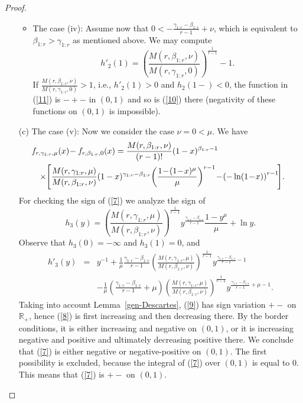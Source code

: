 \documentclass [11pt]{article}
\begin{document}
\begin{proof}
\begin{enumerate}
\begin{itemize}
        \item
        The case (iv): %
        Assume now that $0 < -\frac{\gamma_{1:r}-\beta_{1:r}}{r-1}+\nu $, which is equivalent to $\beta_{1:r}> \gamma_{1:r}$ as mentioned above. We may compute
        \begin{equation*}
        h'_2(1) =  \left(\frac{M(r,\beta_{1:r},\nu)}{M(r,\gamma_{1:r},0)}\right)^{\frac1{r-1}}
        -1.
        \label{13}
        \end{equation*}
        If $\frac{M(r,\beta_{1:r},\nu)}{M(r,\gamma_{1:r},0)}>1$,
        i.e., $h'_2(1)>0$ and $h_2(1-) <0$, the function in (\ref{11}) is $-+-$ in $(0,1)$ and so is (\ref{10}) there (negativity of these functions on $(0,1)$ is impossible).     
        \end{itemize}

\item[(c)]
    The case (v): %
    Now we consider the case $\nu=0 <\mu$. We have
    \begin{eqnarray}
    \lefteqn{f_{r,\gamma_{1:r},\mu}(x) \!-f_{r,\beta_{1:r},0}(x)  =
    \frac{M(r,\beta_{1:r},\nu)}{(r-1)!}
    (1-x)^{\beta_{1:r}-1} } \nonumber \\
     & & \times\!
     \left[ \frac{M(r,\gamma_{1:r},\mu)}{M(r,\beta_{1:r},\nu)}
     (1-x)^{\gamma_{1:r}-
    \beta_{1:r}}\!\left( \frac{1\!-\!(1\!-\!x)^\mu}{\mu}\right)^{r-1}
    \!-\! \left( -\ln (1\!-\!x)\right)^{r-1}\! \right]\!.\;\;
    \label{7}
    \end{eqnarray}
    For checking the sign of (\ref{7}) we analyze the sign of
    \begin{equation}
    h_3(y) = \left(\frac{M(r,\gamma_{1:r},\mu)}{M(r,\beta_{1:r},\nu)}\right)^{\frac1{r-1}}
    y^{\frac{\gamma_{1:r}-\beta_{1:r}}{r-1}}
    \frac{1-y^\mu}{\mu} + \ln y .
    \label{8}
    \end{equation}
    Observe that $h_3(0)=-\infty$ and $h_3(1)=0$, and
    \begin{eqnarray}
    h'_3(y) & = & y^{-1} +\frac{1}{\mu}\frac{\gamma_{1:r}-\beta_{1:r}}{r-1}
    \left(\frac{M(r,\gamma_{1:r},\mu)}{M(r,\beta_{1:r},\nu)}\right)^{\frac1{r-1}}
    y^{\frac{\gamma_{1:r}-\beta_{1:r}}{r-1}-1} \nonumber \\
    & & -
    \frac{1}{\mu}\left(\frac{\gamma_{1:r}-\beta_{1:r}}{r-1}+\mu\right)
    \left(\frac{M(r,\gamma_{1:r},\mu)}{M(r,\beta_{1:r},\nu)}\right)^{\frac1{r-1}}
    y^{\frac{\gamma_{1:r}-\beta_{1:r}}{r-1}+\mu -1} .
    \label{9}
    \end{eqnarray}
    Taking into account Lemma~\ref{gen-Descartes}, (\ref{9}) has sign variation $+-$ on $\mathbb{R}_+$, hence (\ref{8}) is first increasing and then decreasing there.
    By the border conditions, it is either increasing and negative on $(0,1)$, or it is increasing negative and positive and ultimately decreasing positive there.
    We conclude that (\ref{7}) is either negative or negative-positive on $(0,1)$.
    The first possibility is excluded, because the integral of (\ref{7}) over $(0,1)$ is equal to $0$. This means that (\ref{7}) is $+-$ on $(0,1)$.
    

\end{enumerate}
\end{proof}
\end{document}
